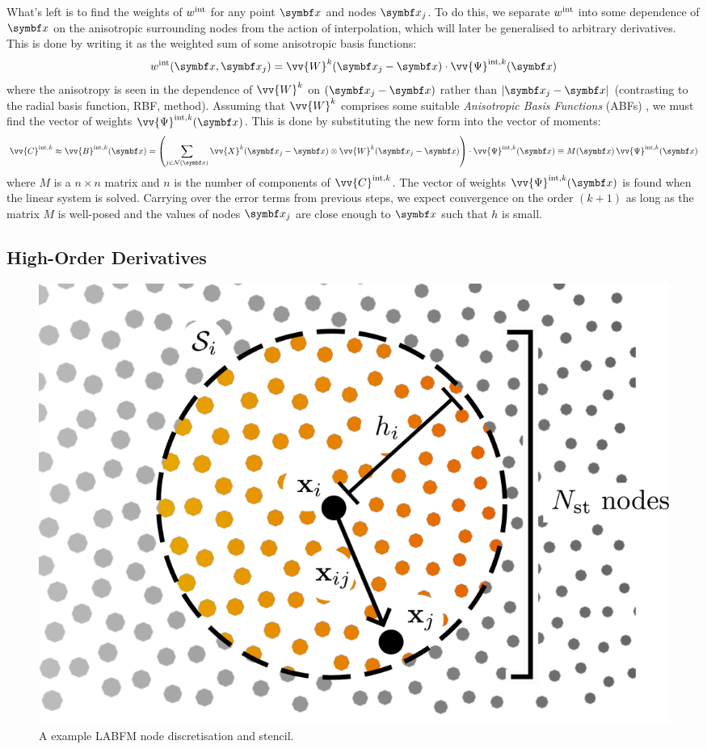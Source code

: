 What's left is to find the weights of $w^{\rm{int}}$ for any point $\vb{x}$ and nodes $\vb{x}_j$. To do this, we separate $w^{\rm{int}}$ into some dependence of $\vb{x}$ on the anisotropic surrounding nodes from the action of interpolation, which will later be generalised to arbitrary derivatives. This is done by writing it as the weighted sum of some anisotropic basis functions:
\begin{equation}
w^{\rm{int}}(\vb{x}, \vb{x}_j) = \vv{W}^k(\vb{x}_j - \vb{x}) \cdot \vv{\Psi}^{\rm{int}, k}(\vb{x})
\end{equation}
where the anisotropy is seen in the dependence of $\vv{W}^k$ on $(\vb{x}_j - \vb{x})$ rather than $|\vb{x}_j - \vb{x}|$ (contrasting to the radial basis function, RBF, method). Assuming that $\vv{W}^k$ comprises some suitable \emph{Anisotropic Basis Functions} (ABFs) \cite{king2022HighOrderSimulationsIsothermal}, we must find the vector of weights $\vv{\Psi}^{\rm{int}, k}(\vb{x})$. This is done by substituting the new form into the vector of moments:
\begin{align}
\vv{C}^{\rm{int}, k}
\approx \vv{B}^{\rm{int}, k}(\vb{x})
= \left( \sum_{j \in \cl{N}(\vb{x})} \vv{X}^k (\vb{x}_j - \vb{x}) \otimes \vv{W}^k(\vb{x}_j - \vb{x}) \right) \cdot \vv{\Psi}^{\rm{int}, k}(\vb{x})
\equiv M(\vb{x}) \, \vv{\Psi}^{\rm{int}, k}(\vb{x})
\end{align}
where $M$ is a $n \times n$ matrix and $n$ is the number of components of $\vv{C}^{\rm{int}, k}$. The vector of weights $\vv{\Psi}^{\rm{int}, k}(\vb{x})$ is found when the linear system is solved. Carrying over the error terms from previous steps, we expect convergence on the order $(k + 1)$ as long as the matrix $M$ is well-posed and the values of nodes $\vb{x}_j$ are close enough to $\vb{x}$ such that $h$ is small.


\subsection{High-Order Derivatives}

\begin{figure}[t]
\centering
\includegraphics[scale=0.25]{assets/imgs/labfm-stencil-drawn_simple.pdf}
\caption{A example LABFM node discretisation and stencil.}
\label{fig:labfm-stencil}
\end{figure}

